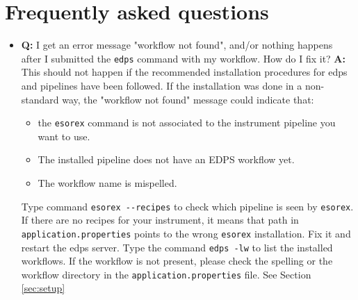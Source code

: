 
\section{Frequently asked questions}
\label{sec:trouble}


\begin{itemize}
    \item {\bf Q:} I get an error message "workflow not found",  and/or nothing happens after I submitted the {\tt edps} command with my workflow. How do I fix it? \newline
    {\bf A:}  This should not happen if the recommended installation procedures for edps and pipelines have been followed. If the installation was done in a non-standard way, the "workflow not found" message could indicate that:
    \begin{itemize}
        \item the {\tt esorex} command is not associated to the instrument pipeline you want to use. 
        \item The installed pipeline does not have an EDPS workflow yet.
        \item The workflow name is mispelled.
     \end{itemize}
  
        Type command {\tt esorex -}{\tt -recipes} to check which pipeline is seen by {\tt esorex}. If there are no recipes for your instrument, it means that path in {\tt application.properties} points to the wrong {\tt esorex} installation. Fix it and restart the edps server. Type the command {\tt edps -lw} to list the installed workflows. If the workflow is not present, please check the spelling or the workflow directory in the {\tt application.properties} file. See Section \ref{sec:setup}



\end{itemize}
